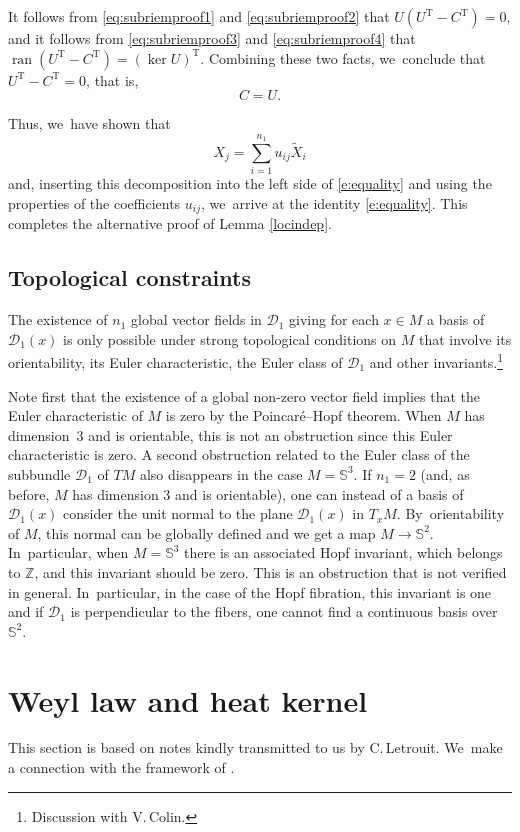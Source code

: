 \documentclass[JEP,XML,SOM,Unicode,published]{cedram}
\theoremstyle{definition}
\newcommand{\1}{\mathbbm{1}}
\newcommand{\Sph}{\mathbb{S}}
\DeclareMathOperator{\ran}{ran}
\begin{document}
It follows from \eqref{eq:subriemproof1} and \eqref{eq:subriemproof2} that $U(U^\mathrm{T} - C^\mathrm{T}) = 0$, and it follows from \eqref{eq:subriemproof3} and \eqref{eq:subriemproof4} that $\ran(U^\mathrm{T} - C^\mathrm{T}) = (\ker U)^\mathrm{T}$. Combining these two facts, we~conclude that $U^\mathrm{T} - C^\mathrm{T}=0$, that is,
\[
C = U.
\]

Thus, we~have shown that
\[
X_j = \sum_{i=1}^{n_1} u_{ij} \tilde X_i
\]
and, inserting this decomposition into the left side of \eqref{e:equality} and using the properties of the coefficients $u_{ij}$, we~arrive at the identity \eqref{e:equality}. This completes the alternative proof of Lemma \ref{locindep}.

\subsection{Topological constraints}\label{ssA.4}
The existence of $n_1$ global vector fields in $\mathcal D_1$ giving for each
$x\in M$ a basis of $\mathcal D_1(x)$ is only possible under strong topological conditions on $M$ that involve its orientability, its Euler characteristic, the Euler class of $\mathcal D_1$ and other invariants.\footnote{Discussion with V.\,Colin.}

Note first that the existence of a global non-zero vector field implies that the Euler characteristic of $M$ is zero by the Poincaré--Hopf theorem.
When $M$ has dimension~3 and is orientable, this is not an obstruction since this Euler characteristic is zero. A second obstruction related to the Euler class of the subbundle $\mathcal D_1$ of $TM$ also disappears in the case $M=\mathbb S^3$. If $n_1=2$ (and, as before, $M$ has dimension 3 and is orientable), one can instead of a basis of $\mathcal D_1(x)$ consider the unit normal to the plane $\mathcal D_1(x)$ in $T_x M$. By~orientability of $M$, this normal can be globally defined and we get a map $M \to \Sph^2$. In~particular, when $M=\mathbb S^3$ there is an associated Hopf invariant, which belongs to $\mathbb Z$, and this invariant should be zero. This is an obstruction that is not verified in general. In~particular, in the case of the Hopf fibration, this invariant is one and if $\mathcal D_1$ is perpendicular to the fibers, one cannot find a continuous basis over~$\mathbb S^2$.

\section{Weyl law and heat kernel}\label{AppC}
This section is based on notes kindly transmitted to us by C.\,Letrouit. We~make a connection with the framework of \cite{CHT1}.
\end{document}
